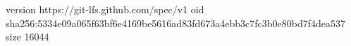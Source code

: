 version https://git-lfs.github.com/spec/v1
oid sha256:5334e09a065f63bf6e4169be5616ad83fd673a4ebb3c7fc3b0e80bd7f4dea537
size 16044

